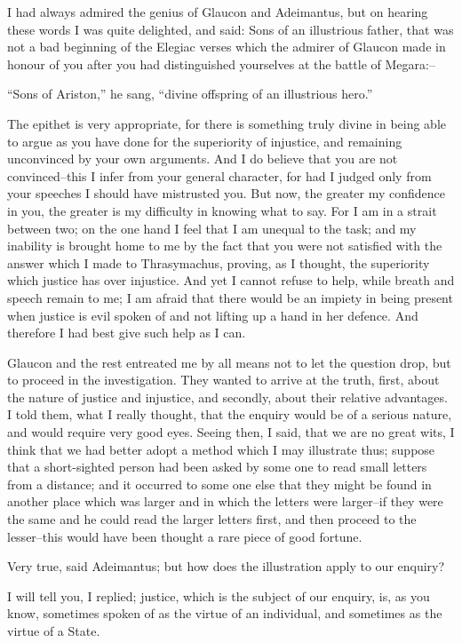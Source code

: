 I had always admired the genius of Glaucon and Adeimantus, but on
hearing these words I was quite delighted, and said: Sons of an
illustrious father, that was not a bad beginning of the Elegiac verses
which the admirer of Glaucon made in honour of you after you had
distinguished yourselves at the battle of Megara:--

``Sons of Ariston,'' he sang, ``divine offspring of an illustrious hero.''

The epithet is very appropriate, for there is something truly divine in
being able to argue as you have done for the superiority of injustice,
and remaining unconvinced by your own arguments. And I do believe that
you are not convinced--this I infer from your general character, for had
I judged only from your speeches I should have mistrusted you. But
now, the greater my confidence in you, the greater is my difficulty in
knowing what to say. For I am in a strait between two; on the one hand I
feel that I am unequal to the task; and my inability is brought home to
me by the fact that you were not satisfied with the answer which I made
to Thrasymachus, proving, as I thought, the superiority which justice
has over injustice. And yet I cannot refuse to help, while breath and
speech remain to me; I am afraid that there would be an impiety in being
present when justice is evil spoken of and not lifting up a hand in her
defence. And therefore I had best give such help as I can.

Glaucon and the rest entreated me by all means not to let the question
drop, but to proceed in the investigation. They wanted to arrive at the
truth, first, about the nature of justice and injustice, and secondly,
about their relative advantages. I told them, what I really thought,
that the enquiry would be of a serious nature, and would require very
good eyes. Seeing then, I said, that we are no great wits, I think that
we had better adopt a method which I may illustrate thus; suppose that
a short-sighted person had been asked by some one to read small letters
from a distance; and it occurred to some one else that they might be
found in another place which was larger and in which the letters were
larger--if they were the same and he could read the larger letters
first, and then proceed to the lesser--this would have been thought a
rare piece of good fortune.

Very true, said Adeimantus; but how does the illustration apply to our
enquiry?

I will tell you, I replied; justice, which is the subject of our
enquiry, is, as you know, sometimes spoken of as the virtue of an
individual, and sometimes as the virtue of a State.

